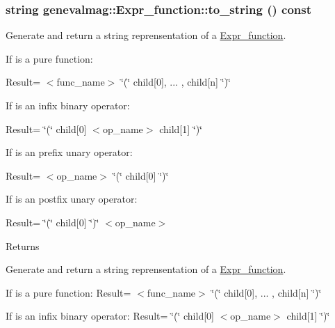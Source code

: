 \hypertarget{classgenevalmag_1_1Expr__function_adaaebd5427337bb2288c47a16af804d8}{
\subsubsection[{to\_\-string}]{\setlength{\rightskip}{0pt plus 5cm}string genevalmag::Expr\_\-function::to\_\-string () const}}
\label{classgenevalmag_1_1Expr__function_adaaebd5427337bb2288c47a16af804d8}
Generate and return a string reprensentation of a \hyperlink{classgenevalmag_1_1Expr__function}{Expr\_\-function}.\par
 \par
 If is a pure function:\par
 Result= $<$func\_\-name$>$ \char`\"{}(\char`\"{} child\mbox{[}0\mbox{]}, ... , child\mbox{[}n\mbox{]} \char`\"{})\char`\"{}\par
 \par
 If is an infix binary operator:\par
 Result= \char`\"{}(\char`\"{} child\mbox{[}0\mbox{]} $<$op\_\-name$>$ child\mbox{[}1\mbox{]} \char`\"{})\char`\"{}\par
 \par
 If is an prefix unary operator:\par
 Result= $<$op\_\-name$>$ \char`\"{}(\char`\"{} child\mbox{[}0\mbox{]} \char`\"{})\char`\"{}\par
 \par
 If is an postfix unary operator:\par
 Result= \char`\"{}(\char`\"{} child\mbox{[}0\mbox{]} \char`\"{})\char`\"{} $<$op\_\-name$>$\par
 \begin{DoxyReturn}{Returns}

\end{DoxyReturn}
Generate and return a string reprensentation of a \hyperlink{classgenevalmag_1_1Expr__function}{Expr\_\-function}.

If is a pure function: Result= $<$func\_\-name$>$ \char`\"{}(\char`\"{} child\mbox{[}0\mbox{]}, ... , child\mbox{[}n\mbox{]} \char`\"{})\char`\"{}

If is an infix binary operator: Result= \char`\"{}(\char`\"{} child\mbox{[}0\mbox{]} $<$op\_\-name$>$ child\mbox{[}1\mbox{]} \char`\"{})\char`\"{}

